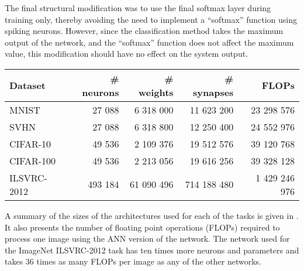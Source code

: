 The final structural modification was to use the final softmax layer
during training only,
thereby avoiding the need to implement a ``softmax'' function using spiking neurons.
However, since the classification method takes the maximum output of the network,
and the ``softmax'' function does not affect the maximum value,
this modification should have no effect on the system output.

\begin{table}
  \centering
  \begin{tabular}{lrrrr}
    Dataset & \# neurons & \# weights & \# synapses & FLOPs \\\hline
    MNIST & 27 088 & 6 318 000 & 11 623 200 & 23 298 576 \\
    SVHN & 27 088 & 6 318 800 & 12 250 400 & 24 552 976 \\
    CIFAR-10 & 49 536 & 2 109 376 & 19 512 576 & 39 120 768 \\
    CIFAR-100 & 49 536 & 2 213 056 & 19 616 256 & 39 328 128 \\
    ILSVRC-2012 & 493 184 & 61 090 496 & 714 188 480 & 1 429 246 976 \\
  \end{tabular}
\end{table}

A summary of the sizes of the architectures used for each of the tasks
is given in .
It also presents the number of floating point operations (FLOPs)
required to process one image using the ANN version of the network.
The network used for the ImageNet ILSVRC-2012 task
has ten times more neurons and parameters
and takes 36 times as many FLOPs per image
as any of the other networks.


